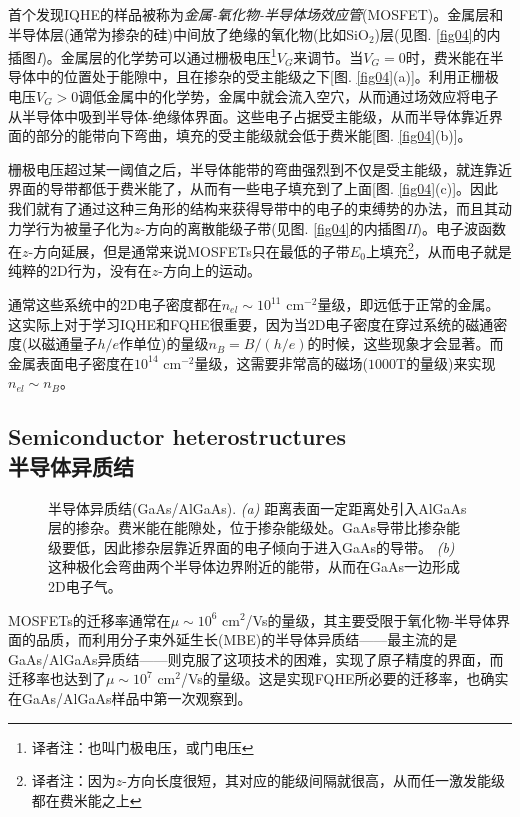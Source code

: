 \documentclass[10pt]{book}
\newcommand\itt{\it\color{blue}}
\begin{document}
首个发现IQHE的样品被称为{\itt 金属-氧化物-半导体场效应管}(MOSFET)。金属层和半导体层(通常为掺杂的硅)中间放了绝缘的氧化物(比如SiO$_2$)层(见图. \ref{fig04}的内插图{\sl I})。金属层的化学势可以通过栅极电压\footnote[2]{译者注：也叫门极电压，或门电压}$V_G$来调节。当$V_G=0$时，费米能在半导体中的位置处于能隙中，且在掺杂的受主能级之下[图. \ref{fig04}(a)]。利用正栅极电压$V_G>0$调低金属中的化学势，金属中就会流入空穴，从而通过场效应将电子从半导体中吸到半导体-绝缘体界面。这些电子占据受主能级，从而半导体靠近界面的部分的能带向下弯曲，填充的受主能级就会低于费米能[图. \ref{fig04}(b)]。

栅极电压超过某一阈值之后，半导体能带的弯曲强烈到不仅是受主能级，就连靠近界面的导带都低于费米能了，从而有一些电子填充到了上面[图. \ref{fig04}(c)]。因此我们就有了通过这种三角形的结构来获得导带中的电子的束缚势的办法，而且其动力学行为被量子化为$z$-方向的离散能级子带(见图. \ref{fig04}的内插图{\sl II})。电子波函数在$z$-方向延展，但是通常来说MOSFETs只在最低的子带$E_0$上填充\footnote[3]{译者注：因为$z$-方向长度很短，其对应的能级间隔就很高，从而任一激发能级都在费米能之上}，从而电子就是纯粹的2D行为，没有在$z$-方向上的运动。
\renewcommand*{\thefootnote}{\arabic{footnote}}

通常这些系统中的2D电子密度都在$n_{el}\sim 10^{11}$ cm$^{-2}$量级，即远低于正常的金属。这实际上对于学习IQHE和FQHE很重要，因为当2D电子密度在穿过系统的磁通密度(以磁通量子$h/e$作单位)的量级$n_B=B/(h/e)$的时候，这些现象才会显著。而金属表面电子密度在$10^{14}$ cm$^{-2}$量级，这需要非常高的磁场($1000$T的量级)来实现$n_{el}\sim n_B$。



\subsection[半导体异质结]{Semiconductor heterostructures\\\bf 半导体异质结}

\begin{figure}
\begin{center}
\end{center}
\caption{半导体异质结(GaAs/AlGaAs). {\sl (a)} 距离表面一定距离处引入AlGaAs层的掺杂。费米能在能隙处，位于掺杂能级处。GaAs导带比掺杂能级要低，因此掺杂层靠近界面的电子倾向于进入GaAs的导带。 {\sl (b)} 这种极化会弯曲两个半导体边界附近的能带，从而在GaAs一边形成2D电子气。}
\label{fig05}
\end{figure}

MOSFETs的迁移率通常在$\mu \sim 10^{6}$ cm$^2$/Vs的量级，其主要受限于氧化物-半导体界面的品质，而利用分子束外延生长(MBE)的半导体异质结——最主流的是GaAs/AlGaAs异质结——则克服了这项技术的困难，实现了原子精度的界面，而迁移率也达到了$\mu \sim 10^{7}$ cm$^2$/Vs的量级。这是实现FQHE所必要的迁移率，也确实在GaAs/AlGaAs样品中第一次观察到\cite{TSG}。
\end{document}
